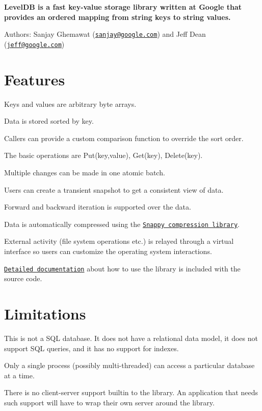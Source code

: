 {\bfseries Level\+D\+B is a fast key-\/value storage library written at Google that provides an ordered mapping from string keys to string values.}

Authors\+: Sanjay Ghemawat (\href{mailto:sanjay@google.com}{\tt sanjay@google.\+com}) and Jeff Dean (\href{mailto:jeff@google.com}{\tt jeff@google.\+com})

\section*{Features}


\begin{DoxyItemize}
\item Keys and values are arbitrary byte arrays.
\item Data is stored sorted by key.
\item Callers can provide a custom comparison function to override the sort order.
\item The basic operations are {\ttfamily Put(key,value)}, {\ttfamily Get(key)}, {\ttfamily Delete(key)}.
\item Multiple changes can be made in one atomic batch.
\item Users can create a transient snapshot to get a consistent view of data.
\item Forward and backward iteration is supported over the data.
\item Data is automatically compressed using the \href{http://code.google.com/p/snappy}{\tt Snappy compression library}.
\item External activity (file system operations etc.) is relayed through a virtual interface so users can customize the operating system interactions.
\item \href{http://htmlpreview.github.io/?https://github.com/google/leveldb/blob/master/doc/index.html}{\tt Detailed documentation} about how to use the library is included with the source code.
\end{DoxyItemize}

\section*{Limitations}


\begin{DoxyItemize}
\item This is not a S\+Q\+L database. It does not have a relational data model, it does not support S\+Q\+L queries, and it has no support for indexes.
\item Only a single process (possibly multi-\/threaded) can access a particular database at a time.
\item There is no client-\/server support builtin to the library. An application that needs such support will have to wrap their own server around the library.
\end{DoxyItemize}

